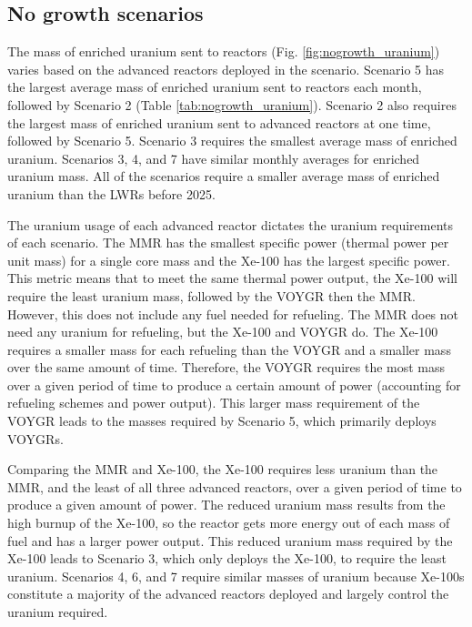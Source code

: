 \subsection{No growth scenarios}
The mass of enriched uranium sent to reactors (Fig. \ref{fig:nogrowth_uranium})
varies based on the advanced reactors deployed in the scenario. 
Scenario 5 has the largest average mass of enriched uranium sent to 
reactors each month, followed by Scenario 2 (Table 
\ref{tab:nogrowth_uranium}). 
Scenario 2 also requires the largest mass of enriched uranium sent 
to advanced reactors at one time, followed by Scenario 5.
Scenario 3 requires the smallest average 
mass of enriched uranium. Scenarios 3, 4, and 7 
have similar monthly averages for enriched uranium mass. All of the 
scenarios require a smaller 
average mass of enriched uranium than the \glspl{LWR} before 2025. 

The uranium usage of each advanced reactor dictates the uranium requirements 
of each scenario. The \gls{MMR} has the smallest specific power (thermal 
power per unit mass) for a single core mass and the Xe-100 has the largest 
specific power. This metric means that to meet the same thermal power 
output, the Xe-100 will require the least uranium mass, followed by the 
VOYGR then the \gls{MMR}. However, this does not include any fuel needed for 
refueling. The \gls{MMR} does not need any uranium for refueling, but the 
Xe-100 and VOYGR do. The Xe-100 requires a smaller mass for each refueling 
than the VOYGR and a smaller mass over the same amount of time. Therefore, 
the VOYGR requires the most mass over a given period of time to produce 
a certain amount of power (accounting for refueling schemes and power  
output). This larger mass requirement of the VOYGR leads to the 
masses required by Scenario 5, 
which primarily deploys VOYGRs.

Comparing the \gls{MMR} and Xe-100, the Xe-100 requires less uranium than 
the \gls{MMR},
and the least of all three advanced reactors, over a given period of time 
to produce a given amount of power. The reduced uranium mass results 
from the high burnup of the Xe-100, so the reactor gets more energy out of 
each mass of fuel and has a larger power output. This reduced uranium mass 
required by the Xe-100 leads to Scenario 3, which only deploys the 
Xe-100, to require the least uranium. Scenarios 4, 6, and 7 require similar 
masses of uranium because Xe-100s constitute a majority of the advanced 
reactors deployed and largely control the uranium required. 

